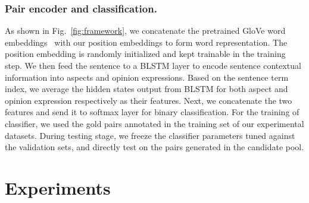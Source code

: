 \documentclass[letterpaper]{article} \usepackage{aaai20}  \usepackage{times}  \usepackage{helvet} \usepackage{courier}  \usepackage[hyphens]{url}  \usepackage{graphicx} \urlstyle{rm} \def\UrlFont{\rm}  \usepackage{graphicx}  \frenchspacing  \setlength{\pdfpagewidth}{8.5in}  \setlength{\pdfpageheight}{11in}
\begin{document}
\subsubsection{Pair encoder and classification.}
As shown in Fig.~\ref{fig:framework}, we concatenate the pretrained GloVe word embeddings~\cite{D14-1162} with our position embeddings to form word representation. The position embedding is randomly initialized and kept trainable in the training step. We then feed the sentence to a BLSTM layer to encode sentence contextual information into aspects and opinion expressions. Based on the sentence term index, we average the hidden states output from BLSTM for both aspect and opinion expression respectively as their features. Next, we concatenate the two features and send it to softmax layer for binary classification. 
For the training of classifier, we used the gold pairs annotated in the training set of our experimental datasets. During testing stage, we freeze the classifier parameters tuned against the validation sets, and directly test on the pairs generated in the candidate pool.


\section{Experiments}\label{sec:experiments}
\end{document}
